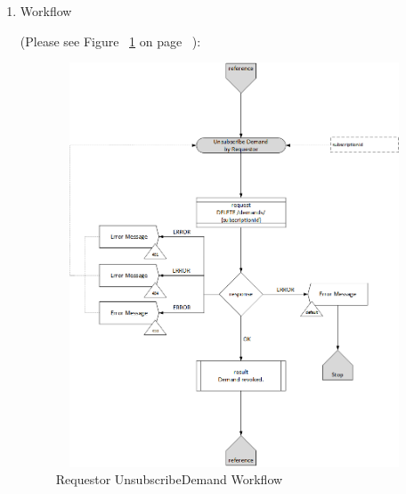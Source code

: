 \begin{enumerate}




\item Workflow

(Please see Figure ~\ref{fig:UsD} on page ~\pageref{fig:UsD}):

\begin{figure}[H]
    \centering
    \includegraphics[width=12cm,height=12cm,angle=0]{./diag/Workflow/Market/UnsubsribeDemand-R-Workflow.png}
    \caption{Requestor UnsubscribeDemand Workflow}
	\label{fig:UsD}
\end{figure}

\end{enumerate}

\newpage



